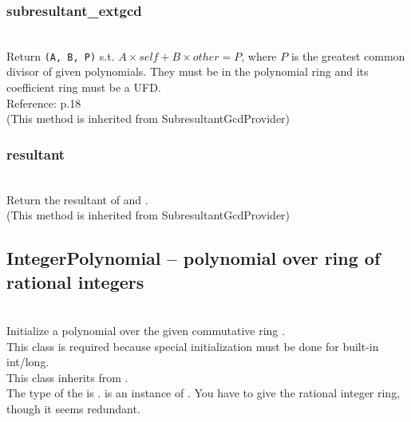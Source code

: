   \subsubsection{subresultant\_extgcd}
  \\
  \spacing
  \quad Return {\tt (A, B, P)} s.t. \(A\times self + B \times other=P\),
  where \(P\) is the greatest common divisor of given polynomials.
  They must be in the polynomial ring and its coefficient ring must be a UFD.\\
  Reference: \cite{Kida}{p.18}\\
  (This method is inherited from SubresultantGcdProvider)

  \subsubsection{resultant}
  \\
  \quad Return the resultant of  and .\\
  (This method is inherited from SubresultantGcdProvider)

 \subsection{IntegerPolynomial -- polynomial over ring of rational integers}
 \initialize
  \\
  \spacing
  \quad Initialize a polynomial over the given commutative ring .\\
  \spacing
  \quad This class is required because special initialization must be
  done for built-in int/long.\\
  \spacing
  \quad This class inherits from .\\
  \spacing
  \quad The type of the  is .
   is an instance of .
  You have to give the rational integer ring, though it seems redundant.

